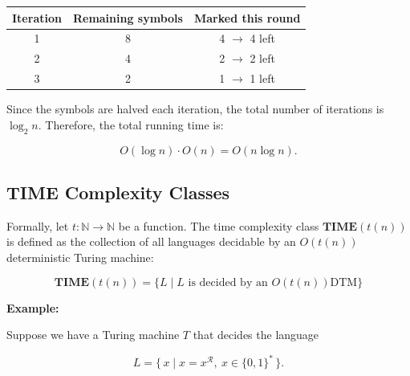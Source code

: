 \documentclass[12pt,a4paper,openany]{article}
\begin{document}
\begin{table}[h]
\centering
\begin{tabular}{|c|c|c|}
\hline
\textbf{Iteration} & \textbf{Remaining symbols} & \textbf{Marked this round} \\
\hline
1 & 8 & 4 $\to$ 4 left \\
2 & 4 & 2 $\to$ 2 left \\
3 & 2 & 1 $\to$ 1 left \\
\hline
\end{tabular}
\end{table}

\noindent Since the symbols are halved each iteration, the total number of iterations is $\log_2 n$.
Therefore, the total running time is:

\[
O(\log n) \cdot O(n) = O(n \log n).
\]

\subsection{TIME Complexity Classes}

Formally, let $ t : \mathbb{N} \to \mathbb{N} $ be a function. The time complexity class $\mathbf{TIME}(t(n))$ is defined as the collection of all languages decidable by an $O(t(n))$ deterministic Turing machine:

\[ \mathbf{TIME}(t(n)) = \{ L \mid L \text{ is decided by an } O(t(n)) \text{DTM} \} \]


\textbf{Example:}

Suppose we have a Turing machine $T$ that decides the language

\[
L = \{\, x \mid x = x^{\mathcal{R}},\ x \in \{0,1\}^* \,\}.
\]

\begin{center}
\end{center}
\end{document}
